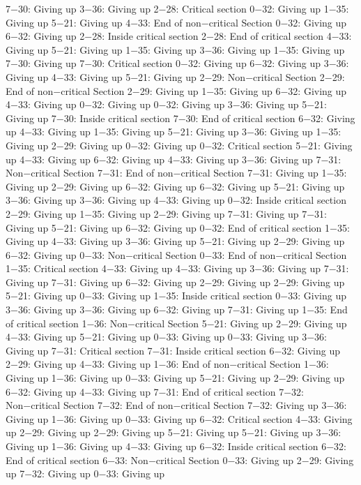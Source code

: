 7−30: Giving up
3−36: Giving up
2−28: Critical section
0−32: Giving up
1−35: Giving up
5−21: Giving up
4−33: End of non−critical Section
0−32: Giving up
6−32: Giving up
2−28: Inside critical section
2−28: End of critical section
4−33: Giving up
5−21: Giving up
1−35: Giving up
3−36: Giving up
1−35: Giving up
7−30: Giving up
7−30: Critical section
0−32: Giving up
6−32: Giving up
3−36: Giving up
4−33: Giving up
5−21: Giving up
2−29: Non−critical Section
2−29: End of non−critical Section
2−29: Giving up
1−35: Giving up
6−32: Giving up
4−33: Giving up
0−32: Giving up
0−32: Giving up
3−36: Giving up
5−21: Giving up
7−30: Inside critical section
7−30: End of critical section
6−32: Giving up
4−33: Giving up
1−35: Giving up
5−21: Giving up
3−36: Giving up
1−35: Giving up
2−29: Giving up
0−32: Giving up
0−32: Critical section
5−21: Giving up
4−33: Giving up
6−32: Giving up
4−33: Giving up
3−36: Giving up
7−31: Non−critical Section
7−31: End of non−critical Section
7−31: Giving up
1−35: Giving up
2−29: Giving up
6−32: Giving up
6−32: Giving up
5−21: Giving up
3−36: Giving up
3−36: Giving up
4−33: Giving up
0−32: Inside critical section
2−29: Giving up
1−35: Giving up
2−29: Giving up
7−31: Giving up
7−31: Giving up
5−21: Giving up
6−32: Giving up
0−32: End of critical section
1−35: Giving up
4−33: Giving up
3−36: Giving up
5−21: Giving up
2−29: Giving up
6−32: Giving up
0−33: Non−critical Section
0−33: End of non−critical Section
1−35: Critical section
4−33: Giving up
4−33: Giving up
3−36: Giving up
7−31: Giving up
7−31: Giving up
6−32: Giving up
2−29: Giving up
2−29: Giving up
5−21: Giving up
0−33: Giving up
1−35: Inside critical section
0−33: Giving up
3−36: Giving up
3−36: Giving up
6−32: Giving up
7−31: Giving up
1−35: End of critical section
1−36: Non−critical Section
5−21: Giving up
2−29: Giving up
4−33: Giving up
5−21: Giving up
0−33: Giving up
0−33: Giving up
3−36: Giving up
7−31: Critical section
7−31: Inside critical section
6−32: Giving up
2−29: Giving up
4−33: Giving up
1−36: End of non−critical Section
1−36: Giving up
1−36: Giving up
0−33: Giving up
5−21: Giving up
2−29: Giving up
6−32: Giving up
4−33: Giving up
7−31: End of critical section
7−32: Non−critical Section
7−32: End of non−critical Section
7−32: Giving up
3−36: Giving up
1−36: Giving up
0−33: Giving up
6−32: Critical section
4−33: Giving up
2−29: Giving up
2−29: Giving up
5−21: Giving up
5−21: Giving up
3−36: Giving up
1−36: Giving up
4−33: Giving up
6−32: Inside critical section
6−32: End of critical section
6−33: Non−critical Section
0−33: Giving up
2−29: Giving up
7−32: Giving up
0−33: Giving up
